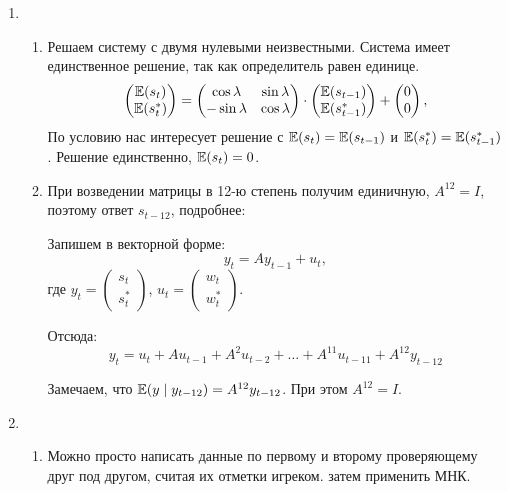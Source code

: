 \begin{enumerate}
\begin{enumerate}
\end{enumerate}

\item \begin{enumerate}
    \item Решаем систему с двумя нулевыми неизвестными. Система имеет единственное решение, так как определитель равен единице.
    \[
    \begin{pmatrix}
    \operatorname{\mathbb{E}}(s_t) \\
    \operatorname{\mathbb{E}}(s_t^*)
    \end{pmatrix} = 
    \begin{pmatrix}
    \cos \lambda & \sin \lambda \\
    -\sin \lambda & \cos \lambda \\
    \end{pmatrix} \cdot 
    \begin{pmatrix}
    \operatorname{\mathbb{E}}(s_{t-1}) \\
    \operatorname{\mathbb{E}}(s_{t-1}^*)
    \end{pmatrix} +
    \begin{pmatrix}
    0 \\
    0
    \end{pmatrix},   
    \]
    По условию нас интересует решение с $\operatorname{\mathbb{E}}(s_t) = \operatorname{\mathbb{E}}(s_{t-1})$ и $\operatorname{\mathbb{E}}(s_t^*) = \operatorname{\mathbb{E}}(s_{t-1}^*)$.
    Решение единственно, $\operatorname{\mathbb{E}}(s_t) =0$.

    \item При возведении матрицы в 12-ю степень получим единичную, $A^{12}=I$, поэтому ответ $s_{t-12}$, подробнее:
    
    Запишем в векторной форме:
    \[
    y_t = A y_{t-1} + u_t,    
    \]
    где $y_t = \begin{pmatrix}
        s_t \\ s_t^*
    \end{pmatrix}$, $u_t = \begin{pmatrix}
        w_t \\ w_t^*
    \end{pmatrix}$.

    Отсюда:
    \[
    y_t = u_t + Au_{t-1} + A^2 u_{t-2} + \ldots + A^{11} u_{t-11} + A^{12} y_{t-12}
    \]

    Замечаем, что $\operatorname{\mathbb{E}}(y \mid y_{t-12}) = A^{12} y_{t-12}$. При этом $A^{12}=I$.

\end{enumerate}

\item \begin{enumerate}
    \item Можно просто написать данные по первому и второму проверяющему друг под другом, считая их отметки игреком. затем применить МНК.
    

\end{enumerate}
\end{enumerate}
